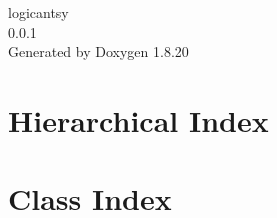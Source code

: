 \let\mypdfximage\pdfximage\def\pdfximage{\immediate\mypdfximage}\documentclass[twoside]{book}
\newcommand{\+}{\discretionary{\mbox{\scriptsize$\hookleftarrow$}}{}{}}
\newcommand{\clearemptydoublepage}{%
  \newpage{\pagestyle{empty}\cleardoublepage}%
}
\begin{document}
\hypersetup{pageanchor=false,
             bookmarksnumbered=true,
             pdfencoding=unicode
            }
\begin{titlepage}
\vspace*{7cm}
\begin{center}%
{\Large logicantsy \\[1ex]\large 0.\+0.\+1 }\\
\vspace*{1cm}
{\large Generated by Doxygen 1.8.20}\\
\end{center}
\end{titlepage}
\clearemptydoublepage
{}
\tableofcontents
\clearemptydoublepage
{}
\hypersetup{pageanchor=true}

\chapter{Hierarchical Index}

\chapter{Class Index}

\end{document}
